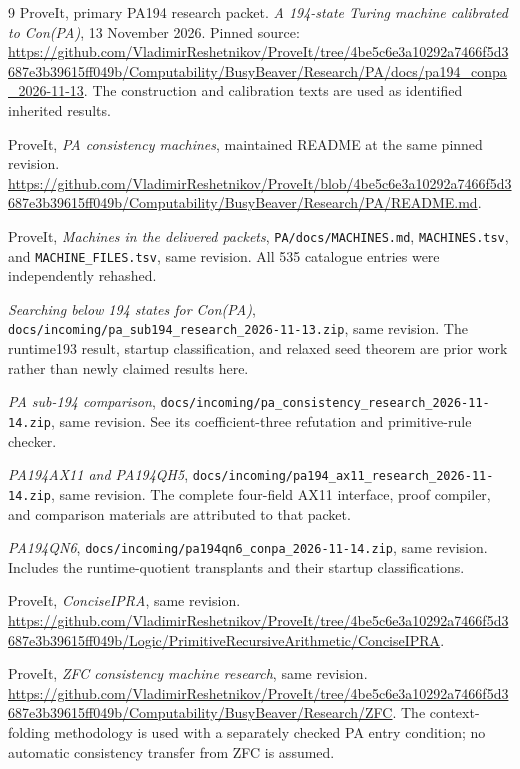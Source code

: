 \documentclass[11pt]{article}
\newcommand{\file}[1]{\nolinkurl{#1}}
\begin{document}
\begin{thebibliography}{9}
 ProveIt, primary PA194 research packet.
\emph{A 194-state Turing machine calibrated to Con(PA)}, 13 November 2026.
Pinned source: \url{https://github.com/VladimirReshetnikov/ProveIt/tree/4be5c6e3a10292a7466f5d3687e3b39615ff049b/Computability/BusyBeaver/Research/PA/docs/pa194_conpa_2026-11-13}.
The construction and calibration texts are used as identified inherited results.

 ProveIt, \emph{PA consistency machines}, maintained README
at the same pinned revision.
\url{https://github.com/VladimirReshetnikov/ProveIt/blob/4be5c6e3a10292a7466f5d3687e3b39615ff049b/Computability/BusyBeaver/Research/PA/README.md}.

 ProveIt, \emph{Machines in the delivered packets},
\file{PA/docs/MACHINES.md}, \file{MACHINES.tsv}, and \file{MACHINE_FILES.tsv},
same revision. All 535 catalogue entries were independently rehashed.

 \emph{Searching below 194 states for Con(PA)},
\file{docs/incoming/pa_sub194_research_2026-11-13.zip}, same revision.
The runtime193 result, startup classification, and relaxed seed theorem are
prior work rather than newly claimed results here.

 \emph{PA sub-194 comparison},
\file{docs/incoming/pa_consistency_research_2026-11-14.zip}, same revision.
See its coefficient-three refutation and primitive-rule checker.

 \emph{PA194AX11 and PA194QH5},
\file{docs/incoming/pa194_ax11_research_2026-11-14.zip}, same revision.
The complete four-field AX11 interface, proof compiler, and comparison
materials are attributed to that packet.

 \emph{PA194QN6},
\file{docs/incoming/pa194qn6_conpa_2026-11-14.zip}, same revision.
Includes the runtime-quotient transplants and their startup classifications.

 ProveIt, \emph{ConciseIPRA}, same revision.
\url{https://github.com/VladimirReshetnikov/ProveIt/tree/4be5c6e3a10292a7466f5d3687e3b39615ff049b/Logic/PrimitiveRecursiveArithmetic/ConciseIPRA}.

 ProveIt, \emph{ZFC consistency machine research}, same revision.
\url{https://github.com/VladimirReshetnikov/ProveIt/tree/4be5c6e3a10292a7466f5d3687e3b39615ff049b/Computability/BusyBeaver/Research/ZFC}.
The context-folding methodology is used with a separately checked PA entry
condition; no automatic consistency transfer from ZFC is assumed.
\end{thebibliography}
\end{document}
